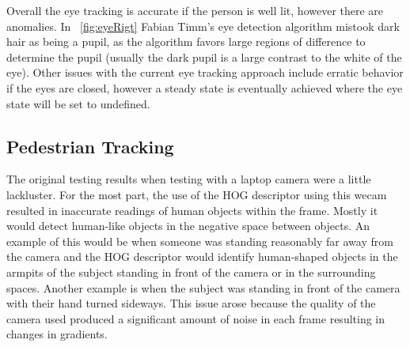 Overall the eye tracking is accurate if the person is well lit, however there are anomalies. In ~\ref{fig:eyeRigt} Fabian Timm's eye detection algorithm mistook dark hair as being a pupil, as the algorithm favors large regions of difference to determine the pupil (usually the dark pupil is a large contrast to the white of the eye). Other issues with the current eye tracking approach include erratic behavior if the eyes are closed, however a steady state is eventually achieved where the eye state will be set to undefined.


\subsection{Pedestrian Tracking}
The original testing results when testing with a laptop camera were a little lackluster. For the most part, the use of the HOG descriptor using this wecam resulted in inaccurate readings of human objects within the frame. Mostly it would detect human-like objects in the negative space between objects. An example of this would be when someone was standing reasonably far away from the camera and the HOG descriptor would identify human-shaped objects in the armpits of the subject standing in front of the camera or in the surrounding spaces. Another example is when the subject was standing in front of the camera with their hand turned sideways. This issue arose because the quality of the camera used produced a significant amount of noise in each frame resulting in changes in gradients.\\




